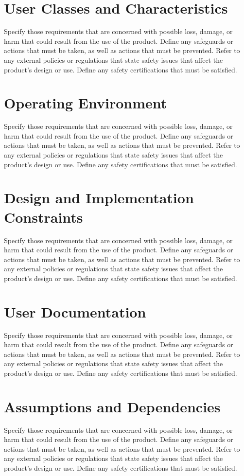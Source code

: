 \documentclass{scrreprt}
\begin{document}
    \section{User Classes and Characteristics}
    Specify those requirements that are concerned with possible loss, damage, or harm that could result from the use of the product. Define any safeguards or actions that must be taken, as well as actions that must be prevented. Refer to any external policies or regulations that state safety issues that affect the product’s design or use. Define any safety certifications that must be satisfied.
    \section{Operating Environment}
    Specify those requirements that are concerned with possible loss, damage, or harm that could result from the use of the product. Define any safeguards or actions that must be taken, as well as actions that must be prevented. Refer to any external policies or regulations that state safety issues that affect the product’s design or use. Define any safety certifications that must be satisfied.
    \section{Design and Implementation Constraints}
    Specify those requirements that are concerned with possible loss, damage, or harm that could result from the use of the product. Define any safeguards or actions that must be taken, as well as actions that must be prevented. Refer to any external policies or regulations that state safety issues that affect the product’s design or use. Define any safety certifications that must be satisfied.
    \section{User Documentation}
    Specify those requirements that are concerned with possible loss, damage, or harm that could result from the use of the product. Define any safeguards or actions that must be taken, as well as actions that must be prevented. Refer to any external policies or regulations that state safety issues that affect the product’s design or use. Define any safety certifications that must be satisfied.
    \section{Assumptions and Dependencies}
    Specify those requirements that are concerned with possible loss, damage, or harm that could result from the use of the product. Define any safeguards or actions that must be taken, as well as actions that must be prevented. Refer to any external policies or regulations that state safety issues that affect the product’s design or use. Define any safety certifications that must be satisfied.
\end{document}
